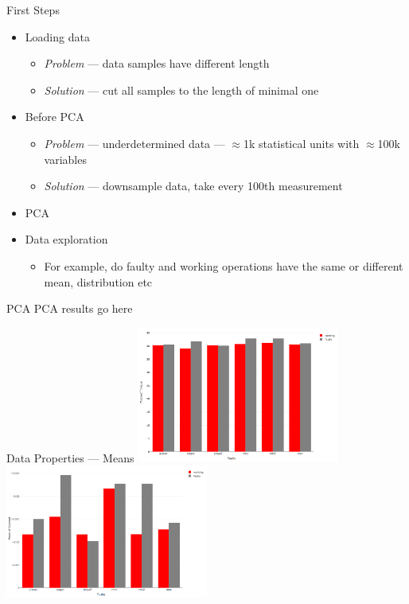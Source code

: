 \documentclass[9pt]{beamer}
\begin{document}
\begin{frame}{First Steps}
\begin{itemize} %
\item Loading data
\begin{itemize}
\item \textit{Problem} --- data samples have different length
\item \textit{Solution} --- cut all samples to the length of minimal one\\
\end{itemize}
\item Before PCA
\begin{itemize}
\item \textit{Problem} --- underdetermined data --- $\approx$1k statistical units with $\approx$100k variables
\item \textit{Solution} --- downsample data, take every 100th measurement
\end{itemize}
\item PCA
\item Data exploration
\begin{itemize}
\item For example, do faulty and working operations have the same or different mean, distribution etc
\end{itemize}
\end{itemize}
\end{frame}
\begin{frame}{PCA}
PCA results go here
\end{frame}
\begin{frame}{Data Properties --- Means}
\includegraphics[width=0.5\textwidth]{TorqueMean1.png}
\includegraphics[width=0.5\textwidth]{CurrentMean2.png}
\end{frame}
\end{document}
